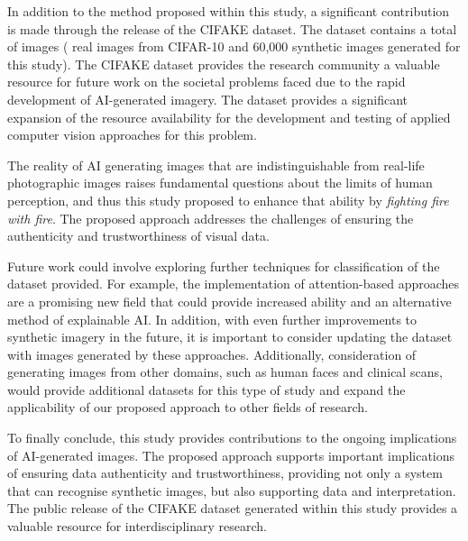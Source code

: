 \documentclass{article}
\begin{document}
In addition to the method proposed within this study, a significant contribution is made through the release of the CIFAKE dataset. The dataset contains a total of  images ( real images from CIFAR-10 and 60,000 synthetic images generated for this study). The CIFAKE dataset provides the research community a valuable resource for future work on the societal problems faced due to the rapid development of AI-generated imagery. The dataset provides a significant expansion of the resource availability for the development and testing of applied computer vision approaches for this problem.

The reality of AI generating images that are indistinguishable from real-life photographic images raises fundamental questions about the limits of human perception, and thus this study proposed to enhance that ability by \textit{fighting fire with fire}. The proposed approach addresses the challenges of ensuring the authenticity and trustworthiness of visual data. 

Future work could involve exploring further techniques for classification of the dataset provided. For example, the implementation of attention-based approaches are a promising new field that could provide increased ability and an alternative method of explainable AI. In addition, with even further improvements to synthetic imagery in the future, it is important to consider updating the dataset with images generated by these approaches. Additionally, consideration of generating images from other domains, such as human faces and clinical scans, would provide additional datasets for this type of study and expand the applicability of our proposed approach to other fields of research. 

To finally conclude, this study provides contributions to the ongoing implications of AI-generated images. The proposed approach supports important implications of ensuring data authenticity and trustworthiness, providing not only a system that can recognise synthetic images, but also supporting data and interpretation. The public release of the CIFAKE dataset generated within this study provides a valuable resource for interdisciplinary research. 




\end{document}
